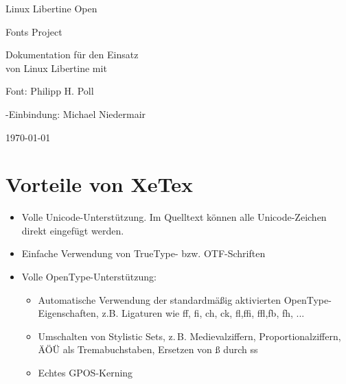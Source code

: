 \documentclass{fontdoku}
\begin{document}
\thispagestyle{empty}

\begin{minipage}{\linewidth}%
   \centering%
   \libertine\fontsize{36pt}{40pt}\selectfont%
   \textcolor{red}{}\quad%
   \fontsize{36pt}{40pt}\selectfont Linux Libertine Open\par
   \hfill\fontsize{36pt}{40pt}\selectfont Fonts Project\quad%
   \fontsize{36pt}{40pt}\selectfont\textcolor{red}{}\par
\end{minipage}

\vfill
\begin{center}
   \fontsize{26pt}{28pt}\selectfont Dokumentation für den Einsatz\\
    von Linux Libertine mit \XeLaTeX
\end{center}

\vfill
\begin{center}\fontsize{20pt}{18pt}\selectfont
Font: Philipp H. Poll\par \XeLaTeX-Einbindung: Michael Niedermair
\end{center}

\vfill
\begin{center}
{\fontsize{6cm}{6cm}\selectfont\Llogo}%
\hfill\fontsize{20pt}{18pt}\selectfont\today
\end{center}
\newpage
\tableofcontents
\newpage
\section{Vorteile von XeTex}

\begin{itemize}
 \item Volle Unicode-Unterstützung. Im Quelltext können alle Unicode-Zeichen direkt eingefügt werden.
 \item Einfache Verwendung von TrueType- bzw. OTF-Schriften
 \item Volle OpenType-Unterstützung:
   \begin{itemize}
   \item Automatische Verwendung der standardmäßig aktivierten OpenType-Eigenschaften, z.B. Ligaturen wie ff, fi, ch, ck, fl,ffi, ffl,fb, fh, ...
    \item Umschalten von Stylistic Sets, z.\,B. Medievalziffern, Proportionalziffern, ÄÖÜ als Tremabuchstaben, Ersetzen von ß durch ss
    \item Echtes GPOS-Kerning
   \end{itemize}

\end{itemize}
\end{document}
